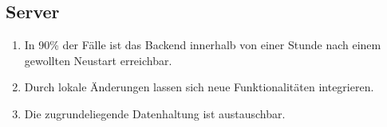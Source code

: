 \subsection{Server}

\begin{enumerate}
    \item In 90\% der Fälle ist das Backend innerhalb von einer Stunde nach einem gewollten Neustart erreichbar.
    \item Durch lokale Änderungen lassen sich neue Funktionalitäten integrieren.
    \item Die zugrundeliegende Datenhaltung ist austauschbar.
\end{enumerate}